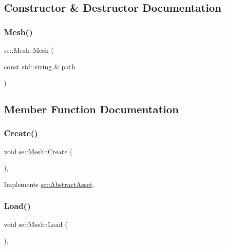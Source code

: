 \subsection{Constructor \& Destructor Documentation}
\mbox{\label{classse_1_1_mesh_ae86eb85813a4f488bcd52a089f63ff0e}} 
\subsubsection{\texorpdfstring{Mesh()}{Mesh()}}
{\footnotesize\ttfamily se\+::\+Mesh\+::\+Mesh (\begin{DoxyParamCaption}\item[{const std\+::string \&}]{path }\end{DoxyParamCaption})}



\subsection{Member Function Documentation}
\mbox{\label{classse_1_1_mesh_a56e2d07f7b642c16e89631796a0d576e}} 
\subsubsection{\texorpdfstring{Create()}{Create()}}
{\footnotesize\ttfamily void se\+::\+Mesh\+::\+Create (\begin{DoxyParamCaption}{ }\end{DoxyParamCaption})\hspace{0.3cm}{\ttfamily [override]}, {\ttfamily [virtual]}}



Implements \mbox{\hyperlink{classse_1_1_abstract_asset_ae3f9fb8f5c26ac8ea511e8e21f5bd624}{se\+::\+Abstract\+Asset}}.

\mbox{\label{classse_1_1_mesh_a17116983a6c6e73770585b72332c5140}} 
\subsubsection{\texorpdfstring{Load()}{Load()}}
{\footnotesize\ttfamily void se\+::\+Mesh\+::\+Load (\begin{DoxyParamCaption}{ }\end{DoxyParamCaption})\hspace{0.3cm}{\ttfamily [override]}, {\ttfamily [virtual]}}



